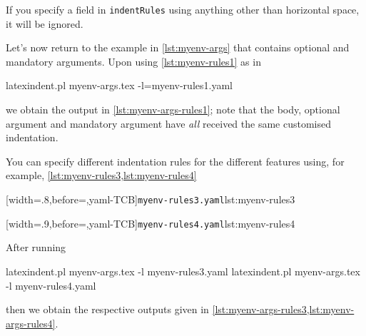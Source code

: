 
If you specify a field in \texttt{indentRules} using anything other than horizontal space, it will be ignored.

Let's now return to the example in \cref{lst:myenv-args} that contains optional and mandatory arguments. Upon using \cref{lst:myenv-rules1} as in
\begin{commandshell}
latexindent.pl myenv-args.tex -l=myenv-rules1.yaml  
\end{commandshell}
we obtain the output in \cref{lst:myenv-args-rules1}; note that the body, optional argument and mandatory argument have \emph{all} 
received the same customised indentation.

You can specify different indentation rules for the different features using, for example, \cref{lst:myenv-rules3,lst:myenv-rules4}

\begin{minipage}{.49\textwidth}
[width=.8\linewidth,before=\centering,yaml-TCB]{\texttt{myenv-rules3.yaml}}{lst:myenv-rules3}
\end{minipage}
\hfill
\begin{minipage}{.49\textwidth}
[width=.9\linewidth,before=\centering,yaml-TCB]{\texttt{myenv-rules4.yaml}}{lst:myenv-rules4}
\end{minipage}

After running
\begin{commandshell}
latexindent.pl myenv-args.tex -l myenv-rules3.yaml  
latexindent.pl myenv-args.tex -l myenv-rules4.yaml  
\end{commandshell}
then we obtain the respective outputs given in \cref{lst:myenv-args-rules3,lst:myenv-args-rules4}.

\begin{minipage}{.45\textwidth}
\end{minipage}
\hfill
\begin{minipage}{.45\textwidth}
\end{minipage}

